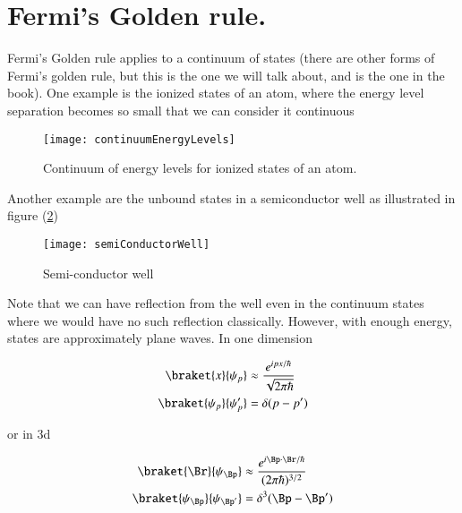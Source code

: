 \section{Fermi's Golden rule.}

Fermi's Golden rule applies to a continuum of states (there are other forms of Fermi's golden rule, but this is the one we will talk about, and is the one in the book).  One example is the ionized states of an atom, where the energy level separation becomes so small that we can consider it continuous

\begin{figure}[htp]
   \centering
   \texttt{[image: continuumEnergyLevels]}
   \caption{Continuum of energy levels for ionized states of an atom.}\label{fig:qmTwoL10:continuumEnergyLevels}
\end{figure}

Another example are the unbound states in a semiconductor well as illustrated in figure (\ref{fig:qmTwoL10:semiConductorWell})
\begin{figure}[htp]
   \centering
   \texttt{[image: semiConductorWell]}
   \caption{Semi-conductor well}\label{fig:qmTwoL10:semiConductorWell}
\end{figure}

Note that we can have reflection from the well even in the continuum states where we would have no such reflection classically.  However, with enough energy, states are approximately plane waves.  In one dimension

\begin{equation}\label{eqn:qmTwoL10:110}
\begin{aligned}
\braket{x}{\psi_p} &\approx \frac{e^{i p x/\hbar}}{\sqrt{2 \pi \hbar}} \\
\braket{\psi_p}{\psi_p'} &= \delta(p - p')
\end{aligned}
\end{equation}

or in 3d

\begin{equation}\label{eqn:qmTwoL10:130}
\begin{aligned}
\braket{\Br}{\psi_{\Bp}} &\approx \frac{e^{i \Bp \cdot \Br/\hbar}}{(2 \pi \hbar)^{3/2} } \\
\braket{\psi_{\Bp}}{\psi_{\Bp'}} &= \delta^3(\Bp - \Bp')
\end{aligned}
\end{equation}

